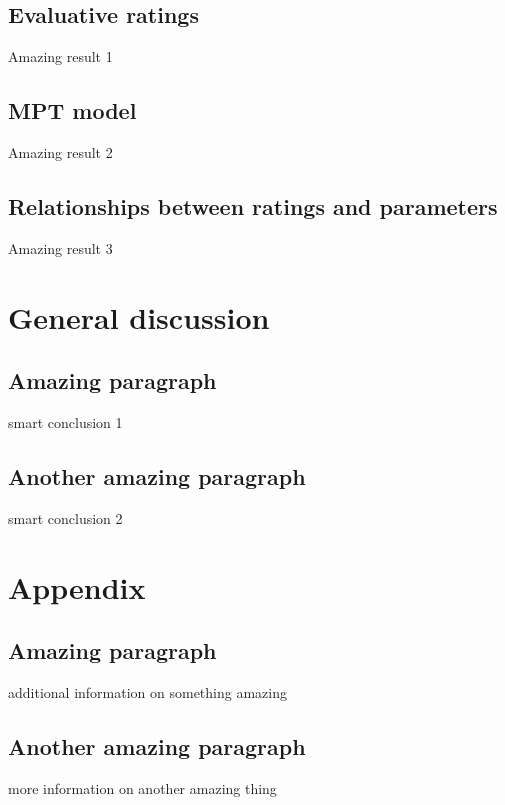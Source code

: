 \documentclass[
  man,floatsintext]{apa6}
\begin{document}
\hypertarget{evaluative-ratings}{%
\subsection{Evaluative ratings}\label{evaluative-ratings}}

Amazing result 1

\hypertarget{mpt-model}{%
\subsection{MPT model}\label{mpt-model}}

Amazing result 2

\hypertarget{relationships-between-ratings-and-parameters}{%
\subsection{Relationships between ratings and parameters}\label{relationships-between-ratings-and-parameters}}

Amazing result 3

\hypertarget{general-discussion}{%
\section{General discussion}\label{general-discussion}}

\hypertarget{amazing-paragraph}{%
\subsection{Amazing paragraph}\label{amazing-paragraph}}

smart conclusion 1

\hypertarget{another-amazing-paragraph}{%
\subsection{Another amazing paragraph}\label{another-amazing-paragraph}}

smart conclusion 2

\hypertarget{appendix}{%
\section{Appendix}\label{appendix}}

\hypertarget{appendix-appendix}{%
\appendix}


\hypertarget{amazing-paragraph-1}{%
\subsection{Amazing paragraph}\label{amazing-paragraph-1}}

additional information on something amazing

\hypertarget{another-amazing-paragraph-1}{%
\subsection{Another amazing paragraph}\label{another-amazing-paragraph-1}}

more information on another amazing thing
\end{document}
